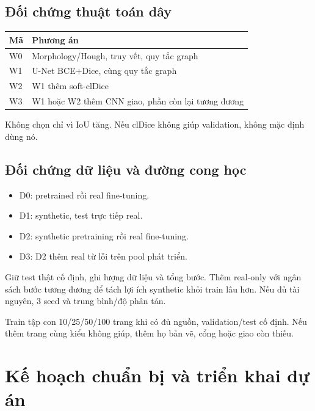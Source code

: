 \documentclass[11pt,a4paper]{article}
\begin{document}
\subsection{Đối chứng thuật toán dây}
\begin{center}
\small
\begin{tabularx}{\linewidth}{L{1cm}Y}
\toprule
Mã & Phương án\\
\midrule
W0 & Morphology/Hough, truy vết, quy tắc graph\\
W1 & U-Net BCE+Dice, cùng quy tắc graph\\
W2 & W1 thêm soft-clDice\\
W3 & W1 hoặc W2 thêm CNN giao, phần còn lại tương đương\\
\bottomrule
\end{tabularx}
\end{center}
Không chọn chỉ vì IoU tăng. Nếu clDice không giúp validation, không mặc định dùng nó.

\subsection{Đối chứng dữ liệu và đường cong học}
\begin{itemize}
  \item D0: pretrained rồi real fine-tuning.
  \item D1: synthetic, test trực tiếp real.
  \item D2: synthetic pretraining rồi real fine-tuning.
  \item D3: D2 thêm real từ lỗi trên pool phát triển.
\end{itemize}
Giữ test thật cố định, ghi lượng dữ liệu và tổng bước. Thêm real-only với ngân sách bước tương đương để tách lợi ích synthetic khỏi train lâu hơn. Nếu đủ tài nguyên, 3 seed và trung bình/độ phân tán.

Train tập con 10/25/50/100 trang khi có đủ nguồn, validation/test cố định. Nếu thêm trang cùng kiểu không giúp, thêm họ bản vẽ, cổng hoặc giao còn thiếu.

\section{Kế hoạch chuẩn bị và triển khai dự án}
\end{document}

